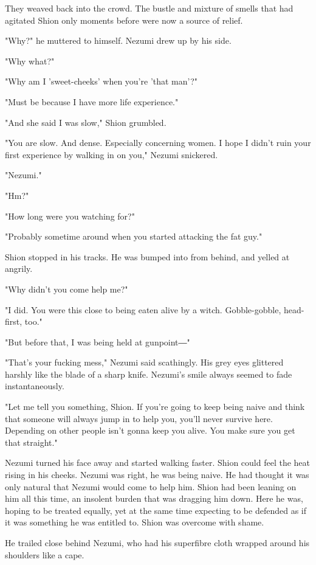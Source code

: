 They weaved back into the crowd. The bustle and mixture of smells that
had agitated Shion only moments before were now a source of relief.

"Why?" he muttered to himself. Nezumi drew up by his side.

"Why what?"

"Why am I 'sweet-cheeks' when you're 'that man'?"

"Must be because I have more life experience."

"And she said I was slow," Shion grumbled.

"You are slow. And dense. Especially concerning women. I hope I didn't
ruin your first experience by walking in on you," Nezumi snickered.

"Nezumi."

"Hm?"

"How long were you watching for?"

"Probably sometime around when you started attacking the fat guy."

Shion stopped in his tracks. He was bumped into from behind, and yelled
at angrily.

"Why didn't you come help me?"

"I did. You were this close to being eaten alive by a witch.
Gobble-gobble, head-first, too."

"But before that, I was being held at gunpoint―"

"That's your fucking mess," Nezumi said scathingly. His grey eyes
glittered harshly like the blade of a sharp knife. Nezumi's smile always
seemed to fade instantaneously.

"Let me tell you something, Shion. If you're going to keep being naive
and think that someone will always jump in to help you, you'll never
survive here. Depending on other people isn't gonna keep you alive. You
make sure you get that straight."

Nezumi turned his face away and started walking faster. Shion could feel
the heat rising in his cheeks. Nezumi was right, he was being naive. He
had thought it was only natural that Nezumi would come to help him.
Shion had been leaning on him all this time, an insolent burden that was
dragging him down. Here he was, hoping to be treated equally, yet at the
same time expecting to be defended as if it was something he was
entitled to. Shion was overcome with shame.

He trailed close behind Nezumi, who had his superfibre cloth wrapped
around his shoulders like a cape.

